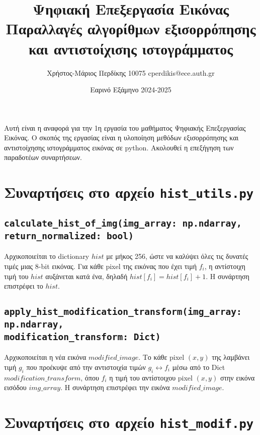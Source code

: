 \documentclass{article}
\title{Ψηφιακή Επεξεργασία Εικόνας \\ Παραλλαγές αλγορίθμων εξισορρόπησης και 
αντιστοίχισης ιστογράμματος}
\date{Εαρινό Εξάμηνο 2024-2025}
\author{Χρήστος-Μάριος Περδίκης 10075 cperdikis@ece.auth.gr}
\begin{document}
\maketitle

Αυτή είναι η αναφορά για την 1η εργασία του μαθήματος Ψηφιακής Επεξεργασίας 
Εικόνας. Ο σκοπός της εργασίας είναι η υλοποίηση μεθόδων εξισορρόπησης και 
αντιστοίχησης ιστογράμματος εικόνας σε python. Ακολουθεί η επεξήγηση των 
παραδοτέων συναρτήσεων.

\section{Συναρτήσεις στο αρχείο \texttt{hist\_utils.py}}
\subsection{\texttt{calculate\_hist\_of\_img(img\_array: np.ndarray, return\_normalized: bool)}}
Αρχικοποιείται το dictionary $hist$ με μήκος 256, ώστε να καλύψει όλες τις δυνατές 
τιμές μιας 8-bit εικόνας. Για κάθε pixel της εικόνας που έχει τιμή $f_i$, 
η αντίστοιχη τιμή του $hist$ αυξάνεται κατά ένα, δηλαδή $hist[f_i] = hist[f_i] + 1$.
Η συνάρτηση επιστρέφει το $hist$.

\subsection{\texttt{apply\_hist\_modification\_transform(img\_array: np.ndarray, \\ modification\_transform: Dict)}}
Αρχικοποιείται η νέα εικόνα $modified\_image$. Το κάθε pixel $(x, y)$ της λαμβάνει
τιμή $g_i$ που προέκυψε από την αντιστοιχία τιμών $g_i \leftrightarrow f_i$ μέσω από το
Dict $modification\_transform$, όπου $f_i$ η τιμή του αντίστοιχου pixel $(x, y)$
στην εικόνα εισόδου $img\_array$. Η συνάρτηση επιστρέφει την εικόνα $modified\_image$.

\section{Συναρτήσεις στο αρχείο \texttt{hist\_modif.py}}
\end{document}
